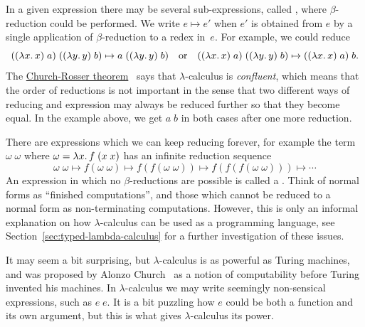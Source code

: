 In a given expression there may be several sub-expressions, called
, where $\beta$-reduction could be performed. We write
$e \mapsto e'$ when $e'$ is obtained from $e$ by a single application
of $\beta$-reduction to a redex in~$e$. For example, we could reduce
%
\begin{equation*}
  ((\lambda x .\,x)\; a)\;((\lambda y .\,y)\;b) \mapsto
  a\; ((\lambda y .\,y)\;b)
  \quad\text{or}\quad
  ((\lambda x .\,x)\; a)\;((\lambda y .\,y)\;b) \mapsto
  ((\lambda x .\,x)\; a)\; b.
\end{equation*}
%
The \href{http://en.wikipedia.org/wiki/Church%E2%80%93Rosser_theorem}{Church-Rosser theorem}~\sidecite{church36:_some_proper_of_conver} says that
$\lambda$-calculus is \emph{confluent}, which means that the order of
reductions is not important in the sense that two different ways of
reducing and expression may always be reduced further so that they
become equal. In the example above, we get $a\;b$ in both cases after
one more reduction.

There are expressions which we can keep reducing forever, for example
the term $\omega\;\omega$ where $\omega = \lambda x .\,f\;(x\;x)$ has an
infinite reduction sequence
%
\begin{equation*}
  \omega\; \omega \mapsto
  f(\omega\; \omega) \mapsto 
  f(f(\omega\; \omega)) \mapsto 
  f(f(f(\omega\; \omega))) \mapsto
  \cdots
\end{equation*}
%
An expression in which no $\beta$-reductions are possible is called a
. Think of normal forms as ``finished
computations'', and those which cannot be reduced to a normal form as
non-terminating computations. However, this is only an informal
explanation on how $\lambda$-calculus can be used as a programming
language, see Section~\ref{sec:typed-lambda-calculus} for a
further investigation of these issues.

It may seem a bit surprising, but $\lambda$-calculus is as powerful as
Turing machines, and was proposed by Alonzo Church~ as a
notion of computability before Turing invented his machines. In
$\lambda$-calculus we may write seemingly non-sensical expressions,
such as $e\; e$. It is a bit puzzling how $e$ could be both a function
and its own argument, but this is what gives $\lambda$-calculus its
power.

